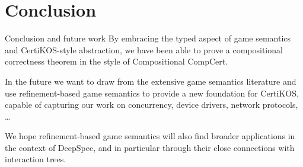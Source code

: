 \documentclass{beamer}
\begin{document}
\section{Conclusion}

\begin{frame}{Conclusion and future work} %
By embracing the typed aspect of game semantics
and CertiKOS-style abstraction,
we have been able to prove a compositional correctness theorem
in the style of Compositional CompCert.

\vspace{1em}
In the future we want to draw from the extensive game semantics
literature and use refinement-based game semantics
to provide a new foundation for CertiKOS,
capable of capturing our work on
concurrency, device drivers, network protocols, \ldots

\vspace{1em}
We hope refinement-based game semantics will also find
broader applications in the context of DeepSpec,
and in particular through their close connections with
interaction trees.
\end{frame}
\end{document}
